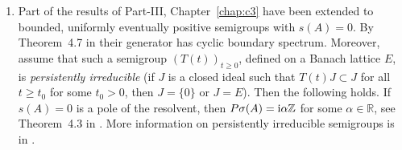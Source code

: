 \begin{enumerate}
\item
Part of the results of Part-III, Chapter~\ref{chap:c3} have been extended  to bounded,  uniformly eventually positive semigroups with $s(A)=0$. 
By Theorem~4.7 in \textcite{zbmath08029955} their generator has cyclic boundary spectrum. 
Moreover, assume that such a semigroup $(T(t))_{t\geq 0}$, defined on a  Banach lattice $E$, is \emph{persistently irreducible} (\ie if $J$ is a closed ideal such that $T(t)J \subset J$ for all $t\geq t_0$ for some  $t_0 > 0$, then $J = \{0\}$ or $J = E$).  
Then the following holds. 
If $s(A) = 0$ is a pole of the resolvent, then $P\sigma(A) = \mathrm{i} \alpha \mathbb{Z}$ for some $\alpha \in \mathbb{R}$, see Theorem~4.3 in \textcite{zbmath08029955}.
More information on persistently irreducible semigroups is in \textcite{zbmath07889246}.

\end{enumerate}
